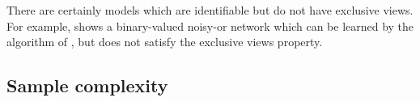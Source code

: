 There are certainly models which are identifiable but do not have exclusive views.
For example,  shows
  a binary-valued noisy-or network which can be
  learned by the algorithm of \citet{halpern13noisyor},
  but does not satisfy the exclusive views property.

\subsection{Sample complexity}
\label{sec:sampleComplexity}



